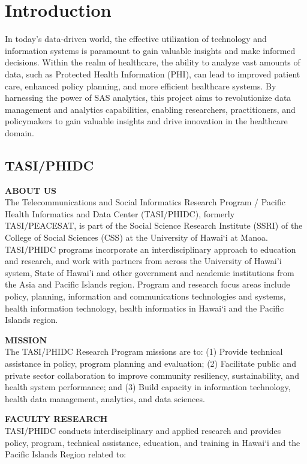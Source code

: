 \section{Introduction} \label{section: introduction}

In today's data-driven world, the effective utilization of technology and information systems is paramount to gain valuable insights and make informed decisions. Within the realm of healthcare, the ability to analyze vast amounts of data, such as Protected Health Information (PHI), can lead to improved patient care, enhanced policy planning, and more efficient healthcare systems. By harnessing the power of SAS analytics, this project aims to revolutionize data management and analytics capabilities, enabling researchers, practitioners, and policymakers to gain valuable insights and drive innovation in the healthcare domain. 

\subsection{TASI/PHIDC}

\textbf{ABOUT US}
\\
The Telecommunications and Social Informatics Research Program / Pacific Health Informatics and Data Center (TASI/PHIDC), formerly TASI/PEACESAT, is part of the Social Science Research Institute (SSRI) of the College of Social Sciences (CSS) at the University of Hawai‘i at Manoa. TASI/PHIDC programs incorporate an interdisciplinary approach to education and research, and work with partners from across the University of Hawai’i system, State of Hawai’i and other government and academic institutions from the Asia and Pacific Islands region. Program and research focus areas include policy, planning, information and communications technologies and systems, health information technology, health informatics in Hawai‘i and the Pacific Islands region.

\textbf{MISSION}
\\
The TASI/PHIDC Research Program missions are to: (1) Provide technical assistance in policy, program planning and evaluation; (2) Facilitate public and private sector collaboration to improve community resiliency, sustainability, and health system performance; and (3) Build capacity in information technology, health data management, analytics, and data sciences.

\textbf{FACULTY RESEARCH}
\\
TASI/PHIDC conducts interdisciplinary and applied research and provides policy, program, technical assistance, education, and training in Hawai‘i and the Pacific Islands Region related to:


